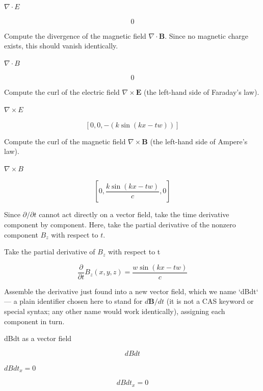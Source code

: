 \documentclass[dvipdfmx]{article}
\begin{document}
$\nabla \cdot E$

\begin{equation}
  0
  \label{eq:E7}
\end{equation}

Compute the divergence of the magnetic field $\nabla\cdot\mathbf B$. Since no magnetic charge exists, this should vanish identically.

$\nabla \cdot B$

\begin{equation}
  0
  \label{eq:E8}
\end{equation}

Compute the curl of the electric field $\nabla\times\mathbf E$ (the left-hand side of Faraday's law).

$\nabla \times E$

\begin{equation}
  \left[ 0 , 0 , -\left(k \sin \left(k x-t w\right)\right) \right]
  \label{eq:E9}
\end{equation}

Compute the curl of the magnetic field $\nabla\times\mathbf B$ (the left-hand side of Ampere's law).

$\nabla \times B$

\begin{equation}
  \left[ 0 , \frac{k \sin \left(k x-t w\right)}{c} , 0 \right]
  \label{eq:E10}
\end{equation}

Since $\partial/\partial t$ cannot act directly on a vector field, take the time derivative component by component. Here, take the partial derivative of the nonzero component $B_z$ with respect to $t$.

Take the partial derivative of $B_z$ with respect to t

\begin{equation}
  \frac{\partial}{\partial t} B_z(x,y,z) = \frac{w \sin \left(k x-t w\right)}{c}
  \label{eq:E11}
\end{equation}

Assemble the derivative just found into a new vector field, which we name `dBdt` — a plain identifier chosen here to stand for $d\mathbf B/dt$ (it is not a CAS keyword or special syntax; any other name would work identically), assigning each component in turn.

dBdt as a vector field

\[
  dBdt
\]

$dBdt_x = 0$

\begin{equation}
  dBdt_x = 0
  \label{eq:E12}
\end{equation}
\end{document}
